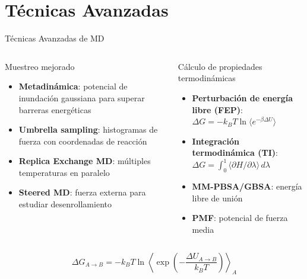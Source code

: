 \documentclass[aspectratio=169, 10pt]{beamer}
\begin{document}
\section{Técnicas Avanzadas}

\begin{frame}{Técnicas Avanzadas de MD}
\begin{columns}[T]
\begin{block}{Muestreo mejorado}
  \begin{itemize}
    \item \textbf{Metadinámica}: potencial de inundación gaussiana para superar barreras energéticas
    \item \textbf{Umbrella sampling}: histogramas de fuerza con coordenadas de reacción
    \item \textbf{Replica Exchange MD}: múltiples temperaturas en paralelo
    \item \textbf{Steered MD}: fuerza externa para estudiar desenrollamiento
  \end{itemize}
\end{block}

\begin{block}{Cálculo de propiedades termodinámicas}
  \begin{itemize}
    \item \textbf{Perturbación de energía libre (FEP)}: $\Delta G = -k_BT\ln\langle e^{-\beta\Delta U}\rangle$
    \item \textbf{Integración termodinámica (TI)}: $\Delta G = \int_0^1 \langle \partial H/\partial\lambda\rangle\,d\lambda$
    \item \textbf{MM-PBSA/GBSA}: energía libre de unión
    \item \textbf{PMF}: potencial de fuerza media
  \end{itemize}
\end{block}
\end{columns}
\vspace{0.4em}
\begin{tcolorbox}[formulabox, title={Energía libre de Gibbs (FEP)}]
\[
\Delta G_{A\to B} = -k_B T \ln \left\langle \exp\!\left(-\frac{\Delta U_{A\to B}}{k_B T}\right)\right\rangle_A
\]
\end{tcolorbox}
\end{frame}
\end{document}
